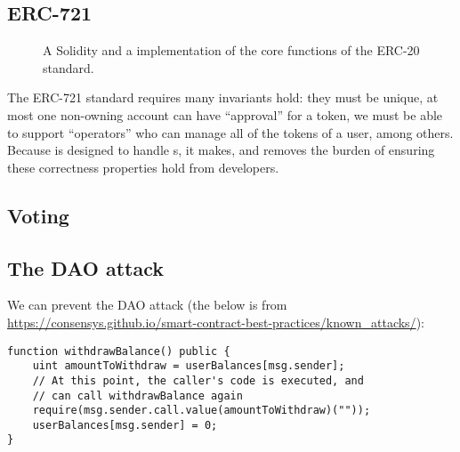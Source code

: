 \documentclass[sigconf]{acmart}
\begin{document}
\subsection{ERC-721}
\begin{figure*}[h]
    \centering
    \begin{minipage}[t]{0.5\textwidth}
        
    \end{minipage}%
    \begin{minipage}[t]{0.5\textwidth}
        
    \end{minipage}
    \caption{A Solidity and a \langName implementation of the core functions of the ERC-20 standard.}
    \label{fig:erc20-impl}
\end{figure*}


The ERC-721 standard  requires many invariants hold:
    they must be unique,
    at most one non-owning account can have ``approval'' for a token,
    we must be able to support ``operators'' who can manage all of the tokens of a user,
    among others.
Because \langName is designed to handle \assetTxt{}s, it makes, and removes the burden of ensuring these correctness properties hold from developers.

\subsection{Voting}

\subsection{The DAO attack}
We can prevent the DAO attack (the below is from \url{https://consensys.github.io/smart-contract-best-practices/known_attacks/}):
\begin{lstlisting}
function withdrawBalance() public {
    uint amountToWithdraw = userBalances[msg.sender];
    // At this point, the caller's code is executed, and
    // can call withdrawBalance again
    require(msg.sender.call.value(amountToWithdraw)(""));
    userBalances[msg.sender] = 0;
}
\end{lstlisting}
\end{document}

